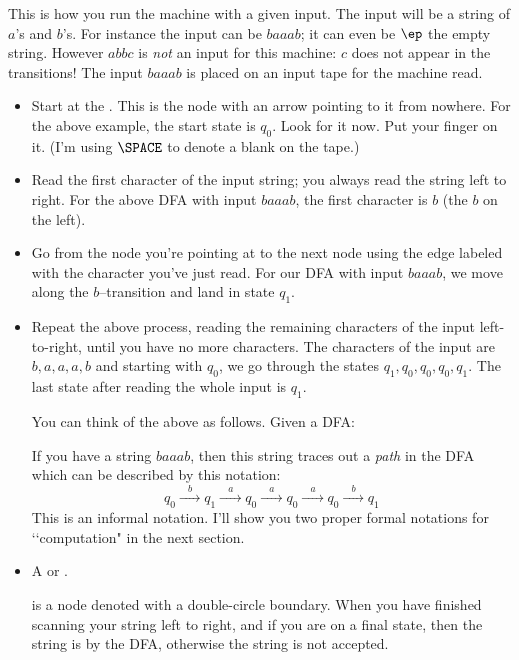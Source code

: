 This is how you run the machine with a given input.
The input will be a string of $a$'s and $b$'s.
For instance the input can be $baaab$; it can even be $\ep$ the empty string.
However $abbc$ is \textit{not} an input for this machine: $c$ does not
appear in the transitions! 
The input $baaab$ is placed on an input tape for the machine read.
\begin{itemize}
 \item Start at the . This is the node with an arrow
 pointing to it from nowhere.
 For the above example, the start state is $q_0$.
 Look for it now. Put your finger on it.
 (I'm using $\SPACE$ to denote a blank on the tape.)



 \item Read the first character of the input string; you always read the string
 left to right. For the above DFA with input $baaab$, the first character is
 $b$ (the $b$ on the left).

 \item Go from the node you're pointing at to the next node using
 the edge labeled with the character you've just read.
 For our DFA with input $baaab$, we move along the $b$--transition
 and land in state $q_1$.




 \item Repeat the above process, reading the remaining characters
 of the input left-to-right, until you have no more characters.
 The characters of the input are $b, a, a, a, b$ and starting with $q_0$,
 we go through the states $q_1, q_0, q_0, q_0, q_1$.
 The last state after reading the whole input is $q_1$.


You can think of the above as follows.
Given a DFA:

If you have a string $baaab$, then this string traces out a \textit{path}
in the DFA which can be described by this notation:
\[
q_0 \xrightarrow{\,\,\,\,\,b\,\,\,\,\,}
q_1 \xrightarrow{\,\,\,\,\,a\,\,\,\,\,}
q_0 \xrightarrow{\,\,\,\,\,a\,\,\,\,\,}
q_0 \xrightarrow{\,\,\,\,\,a\,\,\,\,\,}
q_0 \xrightarrow{\,\,\,\,\,b\,\,\,\,\,}
q_1
\]
This is an informal notation.
I'll show you two proper
formal notations for \lq\lq computation" in the next section.
\item
  A  or
  \sidebarskip{16pt}\sidebarskip{0pt}.

  is a node denoted with a double-circle boundary.
  When you have finished scanning your string left to right, and
  if you are on a final state, then
  the string is  by the DFA, otherwise the string is
  not accepted.

\end{itemize}

